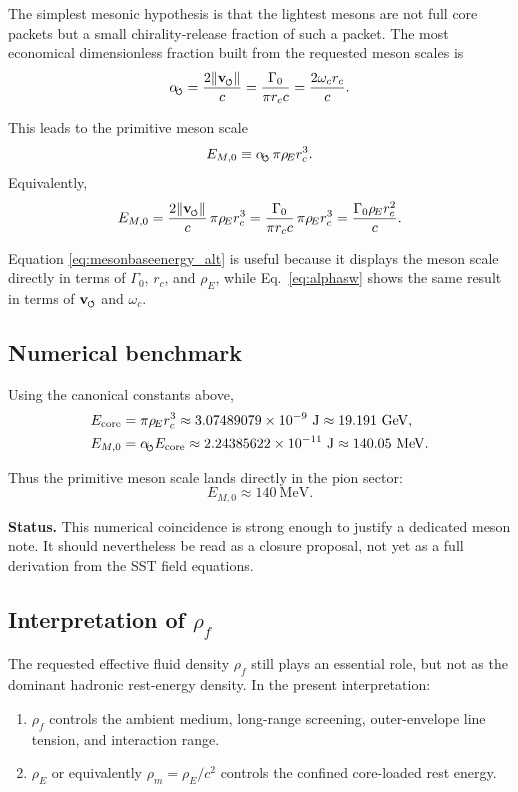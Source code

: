 \documentclass[11pt,a4paper]{article}
\newcommand{\swirlarrow}{\mathchoice{\mkern-2mu\scriptstyle\boldsymbol{\circlearrowleft}}{\mkern-2mu\scriptstyle\boldsymbol{\circlearrowleft}}{\mkern-2mu\scriptscriptstyle\boldsymbol{\circlearrowleft}}{\mkern-2mu\scriptscriptstyle\boldsymbol{\circlearrowleft}}}
\newcommand{\vswirl}{\mathbf{v}_{\swirlarrow}}
\newcommand{\rhof}{\rho_{\!f}}
\newcommand{\rhoE}{\rho_{\!E}}
\newcommand{\rhoM}{\rho_{\!m}}
\newcommand{\rc}{r_c}
\newcommand{\Gammazero}{\Gamma_0}
\newcommand{\omegac}{\omega_c}
\newcommand{\alphasw}{\alpha_{\!\swirlarrow}}
\newcommand{\Status}[1]{\par\smallskip\noindent\textbf{Status.} #1\par\smallskip}
\begin{document}
The simplest mesonic hypothesis is that the lightest mesons are not full core packets but a small chirality-release fraction of such a packet. The most economical dimensionless fraction built from the requested meson scales is
\begin{equation}
\alphasw = \frac{2\lVert \vswirl \rVert}{c}
= \frac{\Gammazero}{\pi \rc c}
= \frac{2\omegac\rc}{c}.
\label{eq:alphasw}
\end{equation}

This leads to the primitive meson scale
\begin{equation}
E_{M,0}
\equiv
\alphasw\,\pi\rhoE\rc^{3}.
\label{eq:mesonbaseenergy}
\end{equation}
Equivalently,
\begin{equation}
E_{M,0}
= \frac{2\lVert \vswirl \rVert}{c}\,\pi\rhoE\rc^{3}
= \frac{\Gammazero}{\pi \rc c}\,\pi\rhoE\rc^{3}
= \frac{\Gammazero\rhoE\rc^{2}}{c}.
\label{eq:mesonbaseenergy_alt}
\end{equation}

Equation \eqref{eq:mesonbaseenergy_alt} is useful because it displays the meson scale directly in terms of \(\Gammazero\), \(\rc\), and \(\rhoE\), while Eq.~\eqref{eq:alphasw} shows the same result in terms of \(\vswirl\) and \(\omegac\).

\subsection{Numerical benchmark}
Using the canonical constants above,
\begin{align}
E_{\text{core}}
&= \pi\rhoE\rc^{3}
\approx 3.07489079\times 10^{-9}\ \mathrm{J}
\approx 19.191\ \mathrm{GeV},\\
E_{M,0}
&= \alphasw E_{\text{core}}
\approx 2.24385622\times 10^{-11}\ \mathrm{J}
\approx 140.05\ \mathrm{MeV}.
\end{align}

Thus the primitive meson scale lands directly in the pion sector:
\begin{equation}
\boxed{E_{M,0} \approx 140\ \mathrm{MeV}.}
\end{equation}

\Status{This numerical coincidence is strong enough to justify a dedicated meson note. It should nevertheless be read as a closure proposal, not yet as a full derivation from the SST field equations.}

\subsection{Interpretation of \(\rhof\)}
The requested effective fluid density \(\rhof\) still plays an essential role, but not as the dominant hadronic rest-energy density. In the present interpretation:
\begin{enumerate}[label=(\arabic*)]
    \item \(\rhof\) controls the ambient medium, long-range screening, outer-envelope line tension, and interaction range.
    \item \(\rhoE\) or equivalently \(\rhoM=\rhoE/c^{2}\) controls the confined core-loaded rest energy.
\end{enumerate}
\end{document}
